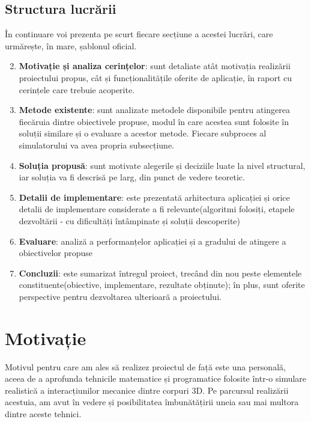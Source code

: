 \documentclass[12pt,a4paper]{report}
\begin{document}
\section{Structura lucrării}
În continuare voi prezenta pe scurt fiecare secțiune a acestei lucrări, care urmărește, în mare, șablonul oficial.
\begin{enumerate}
	\setcounter{enumi}{1}
	\item \textbf{Motivație și analiza cerințelor}: sunt detaliate atât motivația realizării proiectului propus, cât și funcționalitățile oferite de aplicație, în raport cu cerințele care trebuie acoperite.
	\item \textbf{Metode existente}: sunt analizate metodele disponibile pentru atingerea fiecăruia dintre obiectivele propuse, modul în care acestea sunt folosite în soluții similare și o evaluare a acestor metode. Fiecare subproces al simulatorului va avea propria subsecțiune.
	\item \textbf{Soluția propusă}: sunt motivate alegerile și deciziile luate la nivel structural, iar soluția va fi descrisă pe larg, din punct de vedere teoretic.
	\item \textbf{Detalii de implementare}: este prezentată arhitectura aplicației și orice detalii de implementare considerate a fi relevante(algoritmi folosiți, etapele dezvoltării - cu dificultăți întâmpinate și soluții descoperite)
	\item \textbf{Evaluare}: analiză a performanțelor aplicației și a gradului de atingere a obiectivelor propuse
	\item \textbf{Concluzii}: este sumarizat întregul proiect, trecând din nou peste elementele constituente(obiective, implementare, rezultate obținute); în plus, sunt oferite perspective pentru dezvoltarea ulterioară a proiectului.
\end{enumerate}



\chapter{Motivație}
Motivul pentru care am ales să realizez proiectul de față este una personală, aceea de a aprofunda tehnicile matematice și programatice folosite într-o simulare realistică a interacțiunilor mecanice dintre corpuri 3D. Pe parcursul realizării acestuia, am avut în vedere și posibilitatea îmbunătățirii uneia sau mai multora dintre aceste tehnici.
\end{document}
